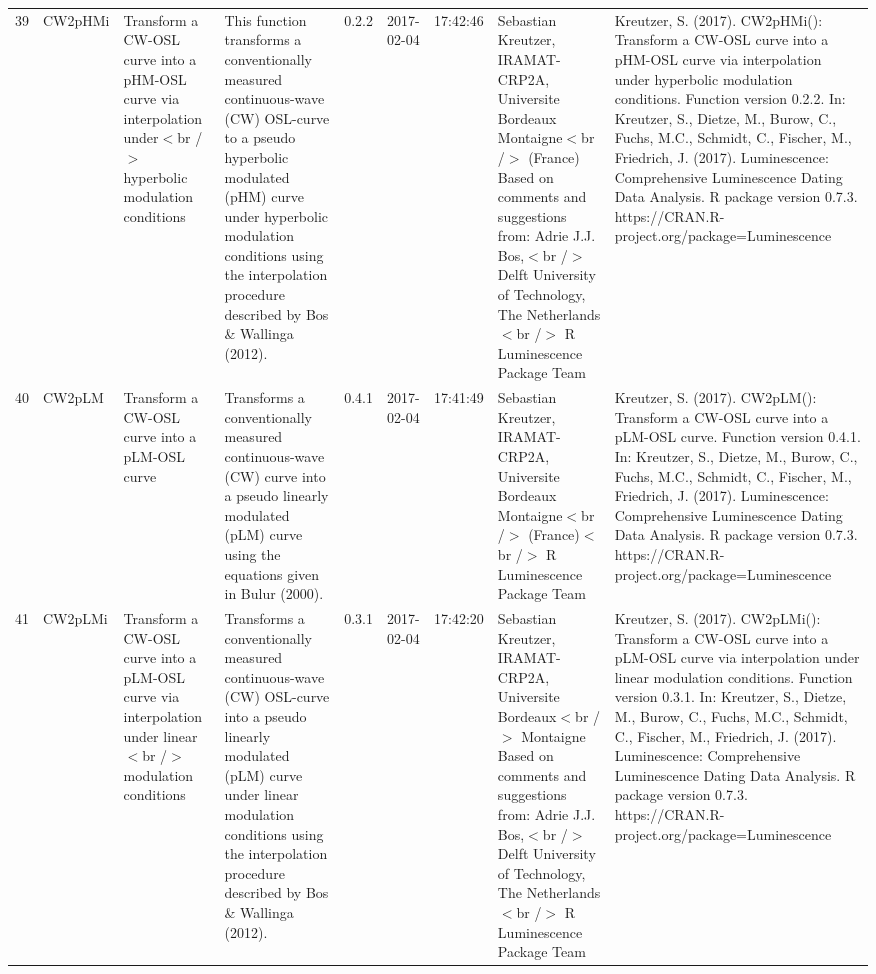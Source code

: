 \begin{table}[ht]
\begin{tabular}{rllllllll}
 \\ 
  39 & CW2pHMi & Transform a CW-OSL curve into a pHM-OSL curve via interpolation under$<$br /$>$ hyperbolic modulation conditions & This function transforms a conventionally measured continuous-wave (CW) OSL-curve to a pseudo hyperbolic modulated (pHM) curve under hyperbolic modulation conditions using the interpolation procedure described by Bos \& Wallinga (2012). & 0.2.2 & 2017-02-04 & 17:42:46
 & Sebastian Kreutzer, IRAMAT-CRP2A, Universite Bordeaux Montaigne$<$br /$>$ (France)   Based on comments and suggestions from:  Adrie J.J. Bos,$<$br /$>$ Delft University of Technology, The Netherlands $<$br /$>$  R Luminescence Package Team & Kreutzer, S. (2017). CW2pHMi(): Transform a CW-OSL curve into a pHM-OSL curve via interpolation under hyperbolic modulation conditions. Function version 0.2.2. In: Kreutzer, S., Dietze, M., Burow, C., Fuchs, M.C., Schmidt, C., Fischer, M., Friedrich, J. (2017). Luminescence: Comprehensive Luminescence Dating Data Analysis. R package version 0.7.3. https://CRAN.R-project.org/package=Luminescence
 \\ 
  40 & CW2pLM & Transform a CW-OSL curve into a pLM-OSL curve & Transforms a conventionally measured continuous-wave (CW) curve into a pseudo linearly modulated (pLM) curve using the equations given in Bulur (2000). & 0.4.1 & 2017-02-04 & 17:41:49
 & Sebastian Kreutzer, IRAMAT-CRP2A, Universite Bordeaux Montaigne$<$br /$>$ (France)$<$br /$>$  R Luminescence Package Team & Kreutzer, S. (2017). CW2pLM(): Transform a CW-OSL curve into a pLM-OSL curve. Function version 0.4.1. In: Kreutzer, S., Dietze, M., Burow, C., Fuchs, M.C., Schmidt, C., Fischer, M., Friedrich, J. (2017). Luminescence: Comprehensive Luminescence Dating Data Analysis. R package version 0.7.3. https://CRAN.R-project.org/package=Luminescence
 \\ 
  41 & CW2pLMi & Transform a CW-OSL curve into a pLM-OSL curve via interpolation under linear$<$br /$>$ modulation conditions & Transforms a conventionally measured continuous-wave (CW) OSL-curve into a pseudo linearly modulated (pLM) curve under linear modulation conditions using the interpolation procedure described by Bos \& Wallinga (2012). & 0.3.1 & 2017-02-04 & 17:42:20
 & Sebastian Kreutzer, IRAMAT-CRP2A, Universite Bordeaux$<$br /$>$ Montaigne  Based on comments and suggestions from:  Adrie J.J. Bos,$<$br /$>$ Delft University of Technology, The Netherlands $<$br /$>$  R Luminescence Package Team & Kreutzer, S. (2017). CW2pLMi(): Transform a CW-OSL curve into a pLM-OSL curve via interpolation under linear modulation conditions. Function version 0.3.1. In: Kreutzer, S., Dietze, M., Burow, C., Fuchs, M.C., Schmidt, C., Fischer, M., Friedrich, J. (2017). Luminescence: Comprehensive Luminescence Dating Data Analysis. R package version 0.7.3. https://CRAN.R-project.org/package=Luminescence

\end{tabular}
\end{table}
